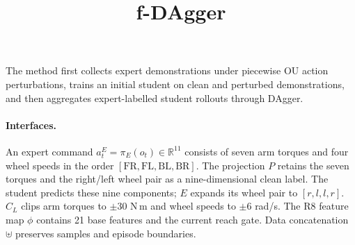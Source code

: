 \documentclass[10pt]{article}
\title{f-DAgger}
\author{}
\date{}
\newcommand{\CL}{C_L}
\begin{document}
\maketitle
\vspace{-2em}

The method first collects expert demonstrations under piecewise OU action
perturbations, trains an initial student on clean and perturbed demonstrations,
and then aggregates expert-labelled student rollouts through DAgger.

\paragraph{Interfaces.}
An expert command $a_t^E=\pi_E(o_t)\in\mathbb R^{11}$ consists of seven arm torques
and four wheel speeds in the order $[\mathrm{FR},\mathrm{FL},\mathrm{BL},\mathrm{BR}]$.
The projection $P$ retains the seven torques and the right/left wheel pair as a
nine-dimensional clean label. The student predicts these nine components;
$E$ expands its wheel pair to $[r,l,l,r]$.
$\CL$ clips arm torques to $\pm30$ N\,m and wheel speeds to $\pm6$ rad/s.
The R8 feature map $\phi$ contains 21 base features and the current reach gate.
Data concatenation $\uplus$ preserves samples and episode boundaries.
\end{document}
